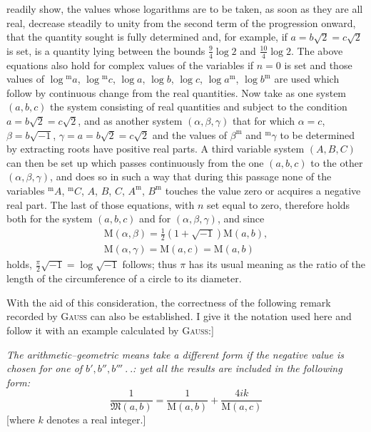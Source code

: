 readily show, the values whose logarithms are to be taken, as soon as they are all real, decrease steadily to unity from the second term of the progression onward, that the quantity sought is fully determined and, for example, if $a=b\surd2=c\surd2$ is set, is a quantity lying between the bounds $\frac94\log2$ and $\frac{10}4\log2$. The above equations also hold for complex values of the variables if $n=0$ is set and those values of $\log{}^{\mathrm{m}}a$, $\log{}^{\mathrm{m}}c$, $\log a$, $\log b$, $\log c$, $\log a^{\mathrm{m}}$, $\log b^{\mathrm{m}}$ are used which follow by continuous change from the real quantities. Now take as one system $(a,b,c)$ the system consisting of real quantities and subject to the condition $a=b\surd2=c\surd2$, and as another system $(\alpha,\beta,\gamma)$ that for which $\alpha=c$, $\beta=b\surd{-1}$, $\gamma=a=b\surd2=c\surd2$ and the values of $\beta^{\mathrm{m}}$ and ${}^{\mathrm{m}}\gamma$ to be determined by extracting roots have positive real parts. A third variable system $(A,B,C)$ can then be set up which passes continuously from the one $(a,b,c)$ to the other $(\alpha,\beta,\gamma)$, and does so
in such a way that during this passage none of the variables ${}^{\mathrm{m}}A$, ${}^{\mathrm{m}}C$, $A$, $B$, $C$, $A^{\mathrm{m}}$, $B^{\mathrm{m}}$ touches the value zero or acquires a negative real part. The last of those equations, with $n$ set equal to zero, therefore holds both for the system $(a,b,c)$ and for $(\alpha,\beta,\gamma)$, and since
\[
\begin{gathered}\mathrm{M}(\alpha,\beta)=\tfrac12(1+\surd{-1})\mathrm{M}(a,b),\\[7pt]
\mathrm{M}(\alpha,\gamma)=\mathrm{M}(a,c)=\mathrm{M}(a,b)\end{gathered}
\]
holds, $\frac{\pi}{2}\surd{-1}=\log\surd{-1}$ follows; thus $\pi$ has its usual meaning as the ratio of the length of the circumference of a circle to its diameter.

\par With the aid of this consideration, the correctness of the following remark recorded by \textsc{Gauss} can also be established. I give it the notation used here and follow it with an example calculated by \textsc{Gauss}:]
\par \textit{The arithmetic–geometric means take a different form if the negative value is chosen for one of $b', b'', b'''\ .\ .$: yet all the results are included in the following form:}
\[
\frac{1}{\mathfrak{M}(a,b)}=\frac{1}{\mathrm{M}(a,b)}+\frac{4ik}{\mathrm{M}(a,c)}
\]
[where $k$ denotes a real integer.]

